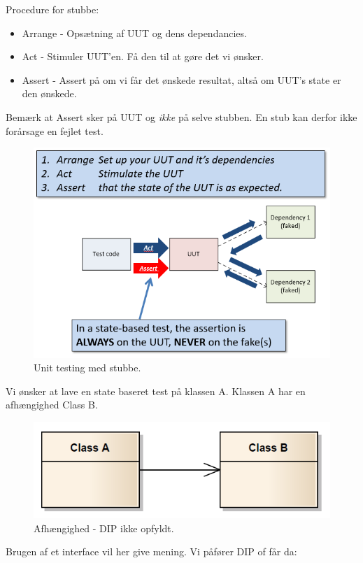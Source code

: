 Procedure for stubbe:
\begin{itemize}
	\item Arrange - Opsætning af UUT og dens dependancies.
	\item Act - Stimuler UUT'en. Få den til at gøre det vi ønsker.
	\item Assert - Assert på om vi får det ønskede resultat, altså om UUT's state er den ønskede.
\end{itemize}

Bemærk at Assert sker på UUT og \textit{ikke} på selve stubben. En stub kan derfor ikke forårsage en fejlet test.

\begin{figure}
	\centering
	\includegraphics[width=0.7\linewidth]{figs/stubTest.PNG}
	\caption{Unit testing med stubbe.}
	\label{fig:stubTest}
\end{figure}

Vi ønsker at lave en state baseret test på klassen A. Klassen A har en afhængighed Class B.

\begin{figure}[H]
	\centering
	\includegraphics[width=0.7\linewidth]{figs/stubNoInterface.PNG}
	\caption{Afhængighed - DIP ikke opfyldt.}
	\label{fig:stubNoInterface}
\end{figure}

Brugen af et interface vil her give mening. Vi påfører DIP of får da:

